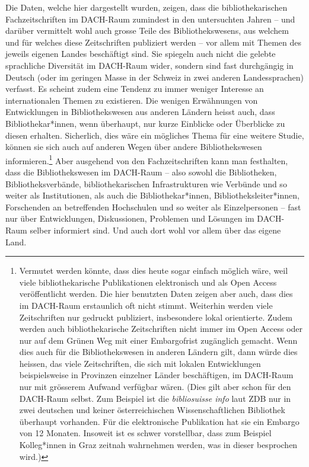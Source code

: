 \documentclass[a4paper,
fontsize=11pt,
oneside,
numbers=noperiodatend,
parskip=half-,
bibliography=totoc,
final
]{scrartcl}
\begin{document}
Die Daten, welche hier dargestellt wurden, zeigen, dass die
bibliothekarischen Fachzeitschriften im DACH-Raum zumindest in den
untersuchten Jahren -- und darüber vermittelt wohl auch grosse Teile des
Bibliothekswesens, aus welchem und für welches diese Zeitschriften
publiziert werden -- vor allem mit Themen des jeweils eigenen Landes
beschäftigt sind. Sie spiegeln auch nicht die gelebte sprachliche
Diversität im DACH-Raum wider, sondern sind fast durchgängig in Deutsch
(oder im geringen Masse in der Schweiz in zwei anderen Landessprachen)
verfasst. Es scheint zudem eine Tendenz zu immer weniger Interesse an
internationalen Themen zu existieren. Die wenigen Erwähnungen von
Entwicklungen in Bibliothekswesen aus anderen Ländern heisst auch, dass
Bibliothekar*innen, wenn überhaupt, nur kurze Einblicke oder Überblicke
zu diesen erhalten. Sicherlich, dies wäre ein mögliches Thema für eine
weitere Studie, können sie sich auch auf anderen Wegen über andere
Bibliothekswesen informieren.\footnote{Vermutet werden könnte, dass dies
  heute sogar einfach möglich wäre, weil viele bibliothekarische
  Publikationen elektronisch und als Open Access veröffentlicht werden.
  Die hier benutzten Daten zeigen aber auch, dass dies im DACH-Raum
  erstaunlich oft nicht stimmt. Weiterhin werden viele Zeitschriften nur
  gedruckt publiziert, insbesondere lokal orientierte. Zudem werden auch
  bibliothekarische Zeitschriften nicht immer im Open Access oder nur
  auf dem Grünen Weg mit einer Embargofrist zugänglich gemacht. Wenn
  dies auch für die Bibliothekswesen in anderen Ländern gilt, dann würde
  dies heissen, das viele Zeitschriften, die sich mit lokalen
  Entwicklungen beispielsweise in Provinzen einzelner Länder
  beschäftigen, im DACH-Raum nur mit grösserem Aufwand verfügbar wären.
  (Dies gilt aber schon für den DACH-Raum selbst. Zum Beispiel ist die
  \emph{bibliosuisse info} laut ZDB nur in zwei deutschen und keiner
  österreichischen Wissenschaftlichen Bibliothek überhaupt vorhanden.
  Für die elektronische Publikation hat sie ein Embargo von 12 Monaten.
  Insoweit ist es schwer vorstellbar, dass zum Beispiel Kolleg*innen in
  Graz zeitnah wahrnehmen werden, was in dieser besprochen wird.)} Aber
ausgehend von den Fachzeitschriften kann man festhalten, dass die
Bibliothekswesen im DACH-Raum -- also sowohl die Bibliotheken,
Bibliotheksverbände, bibliothekarischen Infrastrukturen wie Verbünde und
so weiter als Institutionen, als auch die Bibliothekar*innen,
Bibliotheksleiter*innen, Forschenden an betreffenden Hochschulen und so
weiter als Einzelpersonen -- fast nur über Entwicklungen, Diskussionen,
Problemen und Lösungen im DACH-Raum selber informiert sind. Und auch
dort wohl vor allem über das eigene Land.
\end{document}
